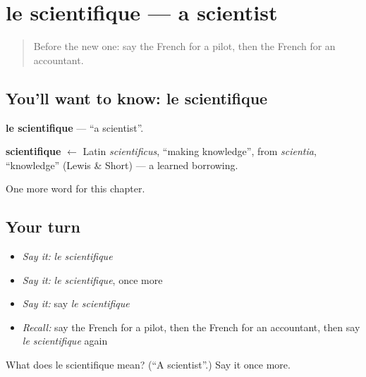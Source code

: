 \section[le scientifique]{le scientifique — a scientist}

\label{lesson:FR-C224-scientifique}



\begin{quote}
Before the new one: say the French for a pilot, then the French for an accountant.
\end{quote}

\subsection*{You'll want to know: le scientifique}
\textbf{le scientifique} — \textquotedblleft{}a scientist\textquotedblright{}.

\begin{cousinweb}
\textbf{scientifique} $\leftarrow$ Latin \emph{scientificus}, \textquotedblleft{}making knowledge\textquotedblright{}, from \emph{scientia}, \textquotedblleft{}knowledge\textquotedblright{} (Lewis \& Short) — a learned borrowing.
\end{cousinweb}

\begin{grammarlens}[title={What you've built}]
One more word for this chapter.
\end{grammarlens}

\subsection*{Your turn}
\begin{itemize}
\raggedright
  \item \emph{Say it:} \emph{le scientifique}
  \item \emph{Say it:} \emph{le scientifique}, once more
  \item \emph{Say it:} say \emph{le scientifique}
  \item \emph{Recall:} say the French for a pilot, then the French for an accountant, then say \emph{le scientifique} again
\end{itemize}

\begin{tcolorbox}[breakable,colback=teal!4,colframe=teal!35!black,title={Before you move on}]
What does le scientifique mean? (\textquotedblleft{}A scientist\textquotedblright{}.) Say it once more.
\end{tcolorbox}
